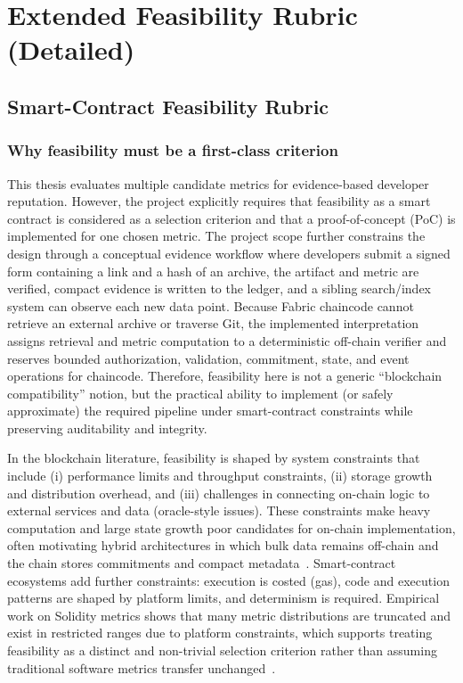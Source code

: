 \section{Extended Feasibility Rubric (Detailed)}
\label{sec:feasibility_rubric_section}

\subsection{Smart-Contract Feasibility Rubric}
\label{sec:feasibility_rubric_full}

\subsubsection{Why feasibility must be a first-class criterion}
This thesis evaluates multiple candidate metrics for evidence-based developer reputation.
However, the project explicitly requires that feasibility as a smart contract is considered as a
selection criterion and that a proof-of-concept (PoC) is implemented for one chosen metric.
The project scope further constrains the design through a conceptual evidence workflow where developers submit
a signed form containing a link and a hash of an archive, the artifact and metric are verified, compact evidence is written
to the ledger, and a sibling search/index system can observe each new data point. Because Fabric chaincode cannot retrieve an
external archive or traverse Git, the implemented interpretation assigns retrieval and metric computation to a deterministic
off-chain verifier and reserves bounded authorization, validation, commitment, state, and event operations for chaincode.
Therefore, feasibility here is not a generic ``blockchain compatibility'' notion, but the practical
ability to implement (or safely approximate) the required pipeline under smart-contract constraints
while preserving auditability and integrity.

In the blockchain literature, feasibility is shaped by system constraints that include (i) performance
limits and throughput constraints, (ii) storage growth and distribution overhead, and (iii) challenges
in connecting on-chain logic to external services and data (oracle-style issues). These constraints
make heavy computation and large state growth poor candidates for on-chain implementation, often
motivating hybrid architectures in which bulk data remains off-chain and the chain stores commitments
and compact metadata~\cite{blockchainsurvey}. Smart-contract ecosystems add further constraints: execution is costed (gas),
code and execution patterns are shaped by platform limits, and determinism is required.
Empirical work on Solidity metrics shows that many metric distributions are truncated and exist in
restricted ranges due to platform constraints, which supports treating feasibility as a distinct and
non-trivial selection criterion rather than assuming traditional software metrics transfer
unchanged~\cite{smartmetrics2023}.

